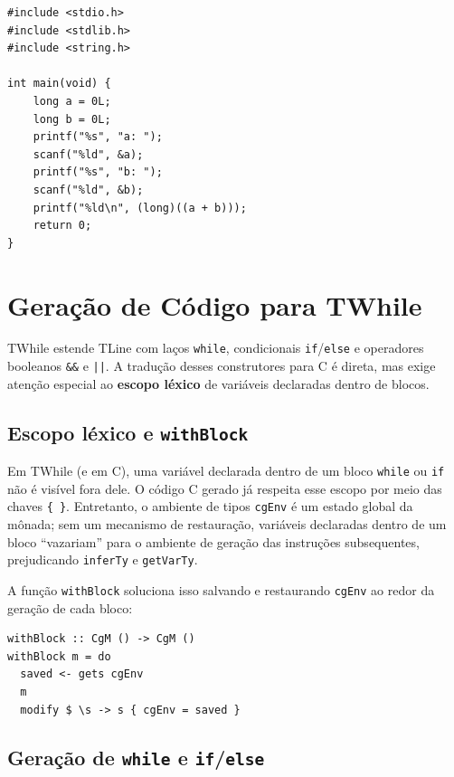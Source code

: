\begin{verbatim}
#include <stdio.h>
#include <stdlib.h>
#include <string.h>

int main(void) {
    long a = 0L;
    long b = 0L;
    printf("%s", "a: ");
    scanf("%ld", &a);
    printf("%s", "b: ");
    scanf("%ld", &b);
    printf("%ld\n", (long)((a + b)));
    return 0;
}
\end{verbatim}

\section{Geração de Código para TWhile}\label{sec:codegen-twhile}

TWhile estende TLine com laços \texttt{while}, condicionais
\texttt{if}/\texttt{else} e operadores booleanos \texttt{\&\&} e \texttt{||}.
A tradução desses construtores para C é direta, mas exige atenção especial ao
\textbf{escopo léxico} de variáveis declaradas dentro de blocos.

\subsection{Escopo léxico e \texttt{withBlock}}

Em TWhile (e em C), uma variável declarada dentro de um bloco \texttt{while}
ou \texttt{if} não é visível fora dele.  O código C gerado já respeita esse
escopo por meio das chaves \texttt{\{ \}}.  Entretanto, o ambiente de tipos
\texttt{cgEnv} é um estado global da mônada; sem um mecanismo de restauração,
variáveis declaradas dentro de um bloco ``vazariam'' para o ambiente de
geração das instruções subsequentes, prejudicando \texttt{inferTy} e
\texttt{getVarTy}.

A função \texttt{withBlock} soluciona isso salvando e restaurando
\texttt{cgEnv} ao redor da geração de cada bloco:

\begin{verbatim}
withBlock :: CgM () -> CgM ()
withBlock m = do
  saved <- gets cgEnv
  m
  modify $ \s -> s { cgEnv = saved }
\end{verbatim}

\subsection{Geração de \texttt{while} e \texttt{if}/\texttt{else}}

